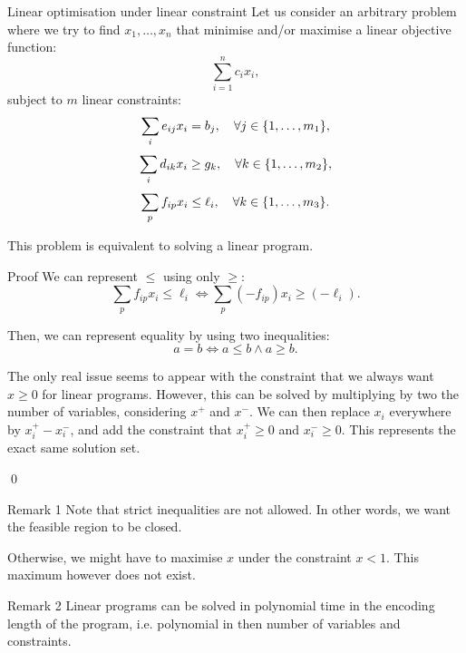 \documentclass[a4paper]{article}
\begin{document}
\begin{parag}{Linear optimisation under linear constraint}
    Let us consider an arbitrary problem where we try to find $x_1, \ldots, x_n$ that minimise and/or maximise a linear objective function: 
    \[\sum_{i=1}^{n} c_i x_i,\]
    subject to $m$ linear constraints: 
    \[\sum_{i} e_{ij} x_i = b_j, \mathspace \forall j \in \left\{1, \ldots, m_1\right\},\] 
    \[\sum_{i} d_{ik} x_i \geq g_k, \mathspace \forall k \in \left\{1, \ldots, m_2\right\},\] 
    \[\sum_{p} f_{ip} x_i \leq \ell_i, \mathspace \forall k \in \left\{1, \ldots, m_3\right\}.\]

    This problem is equivalent to solving a linear program.

    \begin{subparag}{Proof}
        We can represent $\leq$ using only $\geq$: 
        \[\sum_{p} f_{ip} x_i \leq \ell_i \iff \sum_{p} \left(-f_{ip}\right) x_i \geq \left(-\ell_i\right).\]

        Then, we can represent equality by using two inequalities: 
        \[a = b \iff a \leq b \land a \geq b.\]
        
        The only real issue seems to appear with the constraint that we always want $x \geq 0$ for linear programs. However, this can be solved by multiplying by two the number of variables, considering $x^+$ and $x^-$. We can then replace $x_i$ everywhere by $x_i^+ - x_i^-$, and add the constraint that $x_i^+ \geq 0$ and $x_i^- \geq 0$. This represents the exact same solution set.

        \qed
    \end{subparag}

    \begin{subparag}{Remark 1}
        Note that strict inequalities are not allowed. In other words, we want the feasible region to be closed.

        Otherwise, we might have to maximise $x$ under the constraint $x < 1$. This maximum however does not exist.
    \end{subparag}

    \begin{subparag}{Remark 2}
        Linear programs can be solved in polynomial time in the encoding length of the program, i.e. polynomial in then number of variables and constraints.
    \end{subparag}
\end{parag}
\end{document}

